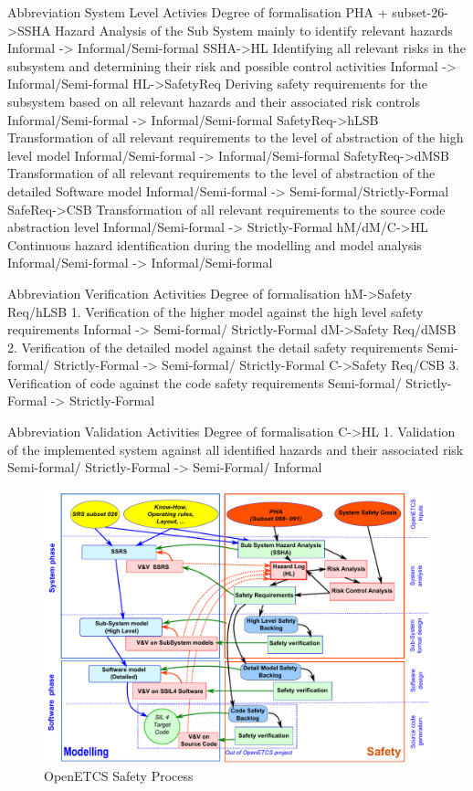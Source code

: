 \documentclass{template/openetcs_article}
\begin{document}
Abbreviation	System Level Activies	Degree of formalisation
PHA + subset-26->SSHA	Hazard Analysis of the Sub System mainly to identify relevant hazards	Informal -> Informal/Semi-formal
SSHA->HL	Identifying all relevant risks in the subsystem and determining their risk and possible control activities	Informal -> Informal/Semi-formal
HL->SafetyReq	Deriving safety requirements for the subsystem based on all relevant hazards and their associated risk controls  	Informal/Semi-formal -> Informal/Semi-formal
SafetyReq->hLSB	Transformation of all relevant requirements to the level of abstraction of the high level model	Informal/Semi-formal -> Informal/Semi-formal
SafetyReq->dMSB	Transformation of all relevant requirements to the level of abstraction of the detailed Software model	Informal/Semi-formal -> Semi-formal/Strictly-Formal
SafeReq->CSB	Transformation of all relevant requirements to the source code abstraction level	Informal/Semi-formal -> Strictly-Formal
hM/dM/C->HL	Continuous hazard identification during the modelling and model analysis	Informal/Semi-formal -> Informal/Semi-formal
		
Abbreviation	Verification Activities	Degree of formalisation
hM->Safety Req/hLSB	1. Verification of the  higher model against the high level safety requirements	Informal -> Semi-formal/ Strictly-Formal
dM->Safety Req/dMSB	2.  Verification of the  detailed model against the detail safety requirements	Semi-formal/ Strictly-Formal -> Semi-formal/ Strictly-Formal
C->Safety Req/CSB	3. Verification of code against the code safety requirements	Semi-formal/ Strictly-Formal -> Strictly-Formal
		
Abbreviation	Validation Activities	Degree of formalisation
C->HL	1. Validation of the implemented system against all identified hazards and their associated risk	Semi-formal/ Strictly-Formal -> Semi-Formal/ Informal

\begin{figure}[h]
\centering
\includegraphics[width=0.8\linewidth]{./images/WholeSafetyProcess}
\caption{OpenETCS Safety Process}
\label{fig:WholeSafetyProcess}
\end{figure}
\end{document}
